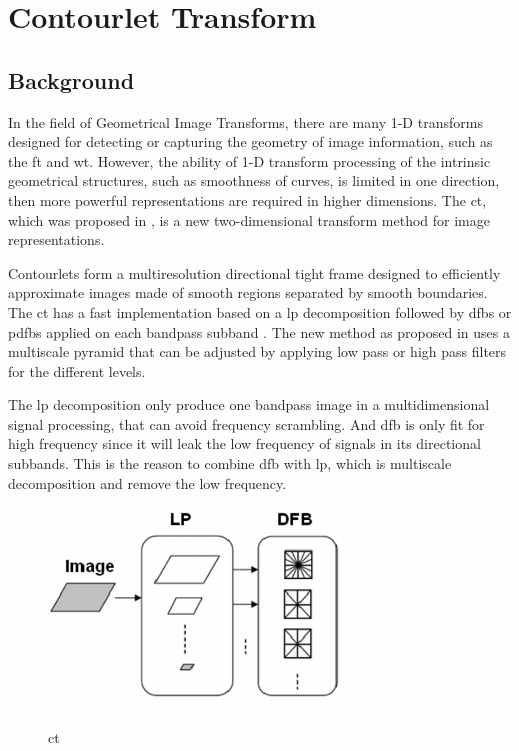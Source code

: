 \section{Contourlet Transform}

\subsection{Background}
In the field of Geometrical Image Transforms, there are many 1-D transforms designed for detecting or capturing the geometry of image information, such as the \gls{ft} and \gls{wt}. However, the ability of 1-D transform processing of the intrinsic geometrical structures, such as smoothness of curves, is limited in one direction, then more powerful representations are required in higher dimensions. The \gls{ct}, which was proposed in \cite{do2005contourlet}, is a new two-dimensional transform method for image representations.

Contourlets form a multiresolution directional tight frame designed to efficiently approximate images made of smooth regions separated by smooth boundaries. The \gls{ct} has a fast implementation based on a \gls{lp} decomposition followed by \glspl{dfb} or \glspl{pdfb} applied on each bandpass subband \cite{suresh2014artificial}. The new method as proposed in \cite{lu2006new} uses a multiscale pyramid that can be adjusted by applying low pass or high pass filters for the different levels.

The \gls{lp} decomposition only produce one bandpass image in a multidimensional signal processing, that can avoid frequency scrambling. And \gls{dfb} is only fit for high frequency since it will leak the low frequency of signals in its directional subbands. This is the reason to combine \gls{dfb} with \gls{lp}, which is multiscale decomposition and remove the low frequency.

\begin{figure}[h]
	\centering
	\includegraphics[width=0.7\textwidth]{fig/contourlet}
	\caption{\glsdesc{ct}}
	\label{fig:contourlet}
\end{figure}


